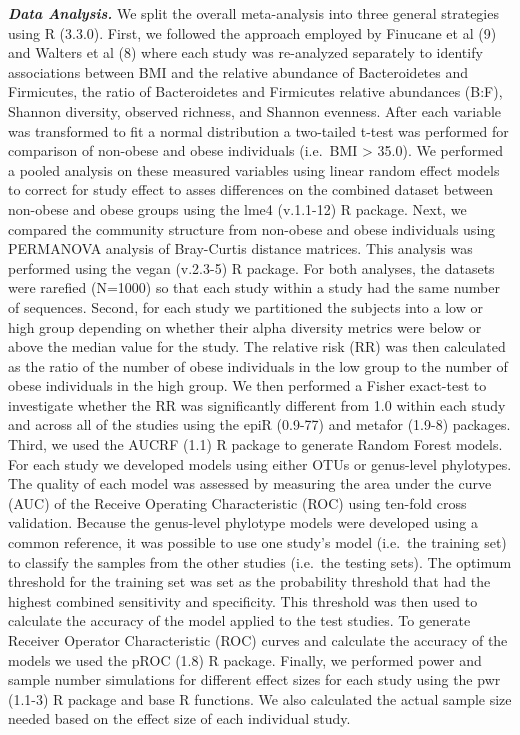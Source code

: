 \documentclass[12pt,]{article}
\begin{document}
\textbf{\emph{Data Analysis.}} We split the overall meta-analysis into
three general strategies using R (3.3.0). First, we followed the
approach employed by Finucane et al (9) and Walters et al (8) where each
study was re-analyzed separately to identify associations between BMI
and the relative abundance of Bacteroidetes and Firmicutes, the ratio of
Bacteroidetes and Firmicutes relative abundances (B:F), Shannon
diversity, observed richness, and Shannon evenness. After each variable
was transformed to fit a normal distribution a two-tailed t-test was
performed for comparison of non-obese and obese individuals (i.e.~BMI
\textgreater{} 35.0). We performed a pooled analysis on these measured
variables using linear random effect models to correct for study effect
to asses differences on the combined dataset between non-obese and obese
groups using the lme4 (v.1.1-12) R package. Next, we compared the
community structure from non-obese and obese individuals using PERMANOVA
analysis of Bray-Curtis distance matrices. This analysis was performed
using the vegan (v.2.3-5) R package. For both analyses, the datasets
were rarefied (N=1000) so that each study within a study had the same
number of sequences. Second, for each study we partitioned the subjects
into a low or high group depending on whether their alpha diversity
metrics were below or above the median value for the study. The relative
risk (RR) was then calculated as the ratio of the number of obese
individuals in the low group to the number of obese individuals in the
high group. We then performed a Fisher exact-test to investigate whether
the RR was significantly different from 1.0 within each study and across
all of the studies using the epiR (0.9-77) and metafor (1.9-8) packages.
Third, we used the AUCRF (1.1) R package to generate Random Forest
models. For each study we developed models using either OTUs or
genus-level phylotypes. The quality of each model was assessed by
measuring the area under the curve (AUC) of the Receive Operating
Characteristic (ROC) using ten-fold cross validation. Because the
genus-level phylotype models were developed using a common reference, it
was possible to use one study's model (i.e.~the training set) to
classify the samples from the other studies (i.e.~the testing sets). The
optimum threshold for the training set was set as the probability
threshold that had the highest combined sensitivity and specificity.
This threshold was then used to calculate the accuracy of the model
applied to the test studies. To generate Receiver Operator
Characteristic (ROC) curves and calculate the accuracy of the models we
used the pROC (1.8) R package. Finally, we performed power and sample
number simulations for different effect sizes for each study using the
pwr (1.1-3) R package and base R functions. We also calculated the
actual sample size needed based on the effect size of each individual
study.
\end{document}

